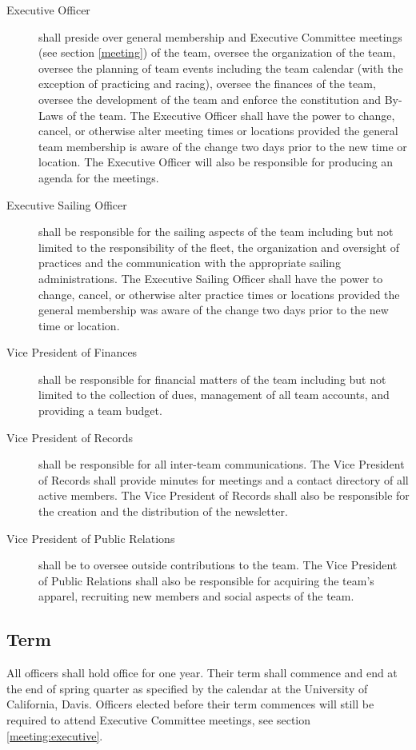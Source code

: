 \documentclass[12pt,titlepage,letter]{article}
\begin{document}
\begin{description}
\item[Executive Officer] shall preside over general membership and Executive Committee meetings (see section \ref{meeting}) of the team, oversee the organization of the team, oversee the planning of team events including the team calendar (with the exception of practicing and racing), oversee the finances of the team, oversee the development of the team and enforce the constitution and By-Laws of the team. The Executive Officer shall have the power to change, cancel, or otherwise alter meeting times or locations provided the general team membership is aware of the change two days prior to the new time or location. The Executive Officer will also be responsible for producing an agenda for the meetings.
\item[Executive Sailing Officer] shall be responsible for the sailing aspects of the team including but not limited to the responsibility of the fleet, the organization and oversight of practices and the communication with the appropriate sailing administrations. The Executive Sailing Officer shall have the power to change, cancel, or otherwise alter practice times or locations provided the general membership was aware of the change two days prior to the new time or location.
\item[Vice President of Finances] shall be responsible for financial matters of the team including but not limited to the collection of dues, management of all team accounts, and providing a team budget.
\item[Vice President of Records] shall be responsible for all inter-team communications. The Vice President of Records shall provide minutes for meetings and a contact directory of all active members. The Vice President of Records shall also be responsible for the creation and the distribution of the newsletter.
\item[Vice President of Public Relations] shall be to oversee outside contributions to the team. The Vice President of Public Relations shall also be responsible for acquiring the team's apparel, recruiting new members and social aspects of the team.
\end{description}

\subsection{Term}
All officers shall hold office for one year. Their term shall commence and end at the end of spring quarter as specified by the calendar at the University of California, Davis. Officers elected before their term commences will still be required to attend Executive Committee meetings, see section \ref{meeting:executive}.
\end{document}
